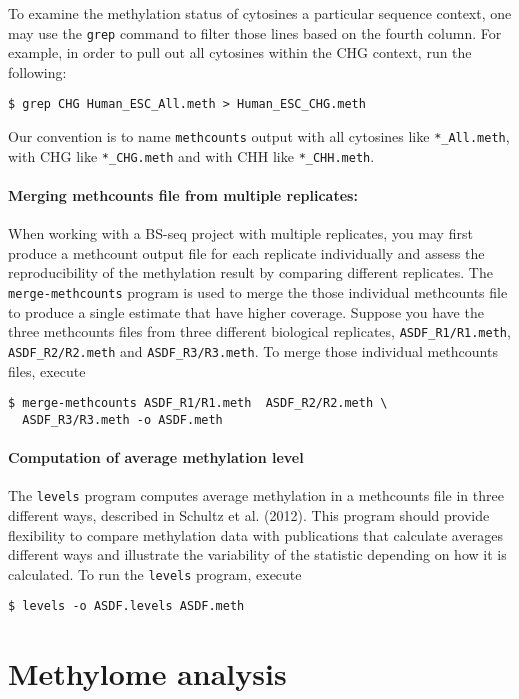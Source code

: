 \documentclass[10pt]{article}
\newcommand{\prog}[1]{\texttt{#1}}
\newcommand{\fn}[1]{\texttt{#1}}
\begin{document}
To examine the methylation status of cytosines a particular sequence
context, one may use the \prog{grep} command to filter those lines
based on the fourth column. For example, in order to pull out all
cytosines within the CHG context, run the following:
\begin{verbatim}
$ grep CHG Human_ESC_All.meth > Human_ESC_CHG.meth
\end{verbatim}
Our convention is to name \prog{methcounts} output with all cytosines
like \fn{*\_All.meth}, with CHG like \fn{*\_CHG.meth} and
with CHH like \fn{*\_CHH.meth}.

\paragraph{Merging methcounts file from multiple replicates:}
\label{sec:merg-methc-file} 
When working with a BS-seq project with multiple replicates, you may
first produce a methcount output file for each replicate individually
and assess the reproducibility of the methylation result by comparing
different replicates. The \prog{merge-methcounts} program is used to
merge the those individual methcounts file to produce a single
estimate that have higher coverage. Suppose you have the three
methcounts files from three different biological replicates,
\fn{ASDF\_R1/R1.meth}, \fn{ASDF\_R2/R2.meth} and
\fn{ASDF\_R3/R3.meth}. To merge those individual methcounts files,
execute
\begin{verbatim}
$ merge-methcounts ASDF_R1/R1.meth  ASDF_R2/R2.meth \
  ASDF_R3/R3.meth -o ASDF.meth
\end{verbatim}

\paragraph{Computation of average methylation level}
The \prog{levels} program computes average methylation in a methcounts
file in three different ways, described in Schultz et al. (2012). This
program should provide flexibility to compare methylation data with
publications that calculate averages different ways and illustrate the
variability of the statistic depending on how it is calculated.  To
run the \prog{levels} program, execute
\begin{verbatim}
$ levels -o ASDF.levels ASDF.meth
\end{verbatim}

\section{Methylome analysis}
\label{sec:high-level-analys}
\end{document}
